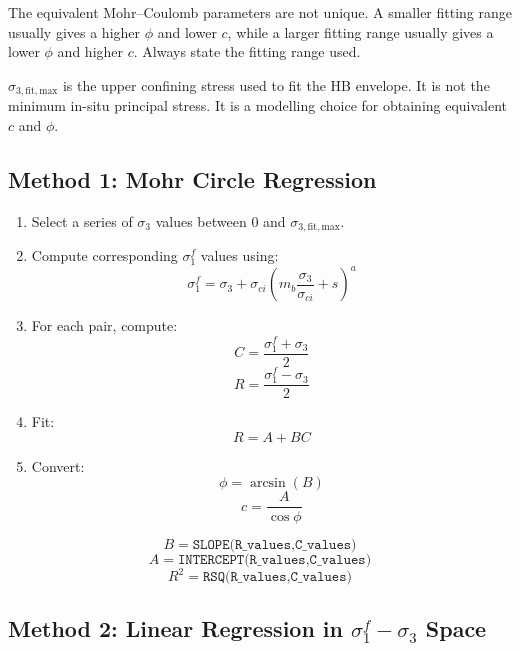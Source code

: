 \documentclass[a4paper,12pt]{article}
\begin{document}
\begin{warnbox}
The equivalent Mohr--Coulomb parameters are not unique. A smaller fitting range usually
gives a higher \(\phi\) and lower \(c\), while a larger fitting range usually gives a lower
\(\phi\) and higher \(c\). Always state the fitting range used.
\end{warnbox}

\begin{notebox}
\(\sigma_{3,\mathrm{fit,max}}\) is the upper confining stress used to fit the HB envelope.
It is not the minimum in-situ principal stress. It is a modelling choice for obtaining
equivalent \(c\) and \(\phi\).
\end{notebox}

\subsection{Method 1: Mohr Circle Regression}

\begin{enumerate}
    \item Select a series of \(\sigma_3\) values between 0 and \(\sigma_{3,\mathrm{fit,max}}\).
    \item Compute corresponding \(\sigma_1^f\) values using:
    \[
    \sigma_1^f =
    \sigma_3+
    \sigma_{ci}
    \left(
    m_b\frac{\sigma_3}{\sigma_{ci}}+s
    \right)^a
    \]
    \item For each pair, compute:
    \[
    C=\frac{\sigma_1^f+\sigma_3}{2}
    \]
    \[
    R=\frac{\sigma_1^f-\sigma_3}{2}
    \]
    \item Fit:
    \[
    R=A+BC
    \]
    \item Convert:
    \[
    \phi=\arcsin(B)
    \]
    \[
    c=\frac{A}{\cos\phi}
    \]
\end{enumerate}

\begin{calcbox}
\[
B=\texttt{SLOPE(R\_values,C\_values)}
\]
\[
A=\texttt{INTERCEPT(R\_values,C\_values)}
\]
\[
R^2=\texttt{RSQ(R\_values,C\_values)}
\]
\end{calcbox}

\subsection{Method 2: Linear Regression in \(\sigma_1^f-\sigma_3\) Space}
\end{document}
